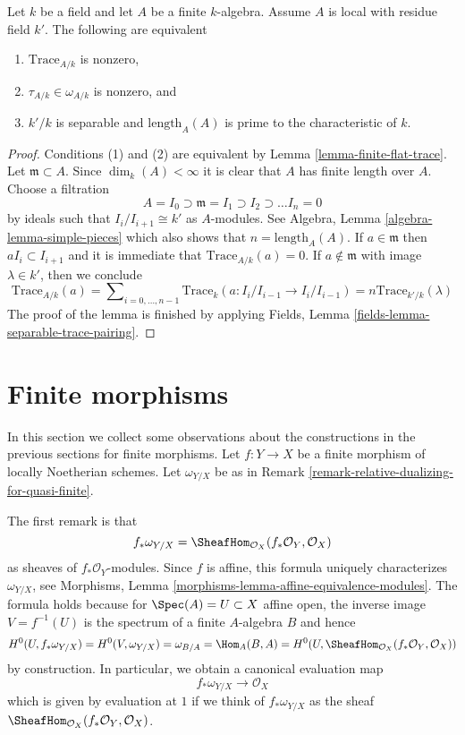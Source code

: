 \begin{lemma}
\label{lemma-tau-nonzero}
Let $k$ be a field and let $A$ be a finite $k$-algebra. Assume $A$
is local with residue field $k'$. The following are equivalent
\begin{enumerate}
\item $\text{Trace}_{A/k}$ is nonzero,
\item $\tau_{A/k} \in \omega_{A/k}$ is nonzero, and
\item $k'/k$ is separable and $\text{length}_A(A)$ is prime
to the characteristic of $k$.
\end{enumerate}
\end{lemma}

\begin{proof}
Conditions (1) and (2) are equivalent by Lemma \ref{lemma-finite-flat-trace}.
Let $\mathfrak m \subset A$. Since $\dim_k(A) < \infty$ it is clear that
$A$ has finite length over $A$. Choose a filtration
$$
A = I_0 \supset \mathfrak m = I_1 \supset I_2 \supset \ldots I_n = 0
$$
by ideals such that $I_i/I_{i + 1} \cong k'$ as $A$-modules. See
Algebra, Lemma \ref{algebra-lemma-simple-pieces} which also shows that
$n = \text{length}_A(A)$. If $a \in \mathfrak m$ then $aI_i \subset I_{i + 1}$
and it is immediate that $\text{Trace}_{A/k}(a) = 0$.
If $a \not \in \mathfrak m$ with image $\lambda \in k'$, then
we conclude
$$
\text{Trace}_{A/k}(a) =
\sum\nolimits_{i = 0, \ldots, n - 1}
\text{Trace}_k(a : I_i/I_{i - 1} \to I_i/I_{i - 1}) =
n \text{Trace}_{k'/k}(\lambda)
$$
The proof of the lemma is finished by applying
Fields, Lemma \ref{fields-lemma-separable-trace-pairing}.
\end{proof}






\section{Finite morphisms}
\label{section-finite-morphisms}

\noindent
In this section we collect some observations about the
constructions in the previous sections for finite morphisms.
Let $f : Y \to X$ be a finite morphism of locally Noetherian schemes.
Let $\omega_{Y/X}$ be as in
Remark \ref{remark-relative-dualizing-for-quasi-finite}.

\medskip\noindent
The first remark is that
$$
f_*\omega_{Y/X} = \SheafHom_{\mathcal{O}_X}(f_*\mathcal{O}_Y, \mathcal{O}_X)
$$
as sheaves of $f_*\mathcal{O}_Y$-modules. Since $f$ is affine, this
formula uniquely characterizes $\omega_{Y/X}$, see
Morphisms, Lemma \ref{morphisms-lemma-affine-equivalence-modules}.
The formula holds because for $\Spec(A) = U \subset X$ affine open, the
inverse image $V = f^{-1}(U)$ is the spectrum of a finite $A$-algebra
$B$ and hence
$$
H^0(U, f_*\omega_{Y/X}) =
H^0(V, \omega_{Y/X}) =
\omega_{B/A} =
\Hom_A(B, A) =
H^0(U, \SheafHom_{\mathcal{O}_X}(f_*\mathcal{O}_Y, \mathcal{O}_X))
$$
by construction. In particular, we obtain a canonical evaluation map
$$
f_*\omega_{Y/X} \longrightarrow \mathcal{O}_X
$$
which is given by evaluation at $1$ if we think of $f_*\omega_{Y/X}$
as the sheaf $\SheafHom_{\mathcal{O}_X}(f_*\mathcal{O}_Y, \mathcal{O}_X)$.

